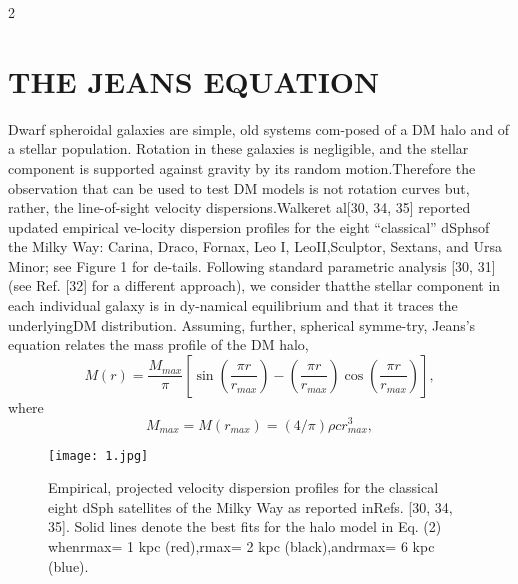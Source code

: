 \documentclass{article}
\begin{document}
\begin{multicols} {2}
\section{THE JEANS EQUATION}
Dwarf spheroidal galaxies are simple, old systems com-posed of a DM halo and of a stellar population.  Rotation in these galaxies is negligible, and the stellar component is supported against gravity by its random motion.Therefore the observation that can be used to test DM models is not rotation curves but, rather, the line-of-sight velocity dispersions.Walkeret al[30, 34, 35] reported updated empirical ve-locity dispersion profiles for the eight “classical” dSphsof the Milky Way:  Carina, Draco, Fornax, Leo I, LeoII,Sculptor, Sextans, and Ursa Minor; see Figure 1 for de-tails.   Following  standard  parametric  analysis  [30,  31](see Ref. [32] for a different approach), we consider thatthe stellar component in each individual galaxy is in dy-namical  equilibrium  and  that  it  traces  the  underlyingDM  distribution.   Assuming,  further,  spherical  symme-try, Jeans’s equation relates the mass profile of the DM halo,
\begin{equation}
 M(r)={\frac{M_{max}}{\pi}}{\left[\sin{\left(\frac{\pi r}{r_{max}}\right)}−{\left({\frac{\pi r}{r_{max}}}\right)}\cos{\left({\frac{\pi r}{r_{max}}}\right)}\right]},
\end{equation}
where
\begin{equation}
M_{max}=M(r_{max}) = (4/\pi)\rho cr^3_{max},
\end{equation}
\end{multicols}
\begin{figure}[h]
\centering
\texttt{[image: 1.jpg]}
\caption{\label{fig:1}Empirical, projected velocity dispersion profiles for the classical eight dSph satellites of the Milky Way as reported inRefs. [30, 34, 35].  Solid lines denote the best fits for the halo model in Eq. (2) whenrmax= 1 kpc (red),rmax= 2 kpc (black),andrmax= 6 kpc (blue).}
\end{figure}
\end{document}
